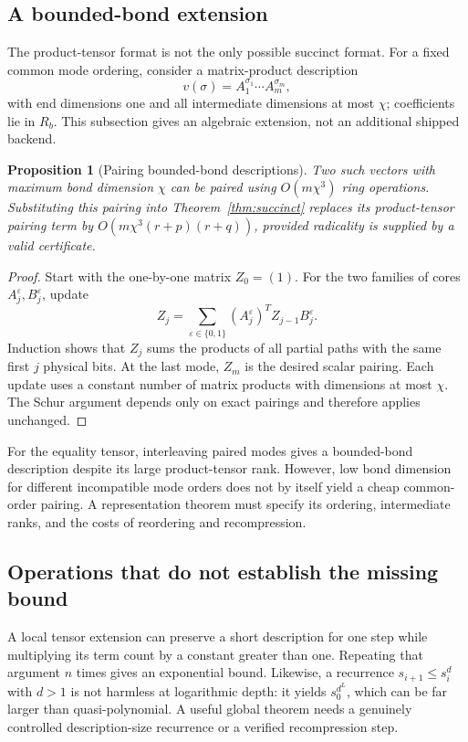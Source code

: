 \documentclass[11pt]{article}
\newtheorem{proposition}[theorem]{Proposition}
\theoremstyle{definition}\newtheorem{definition}[theorem]{Definition}
\theoremstyle{remark}\newtheorem{remark}[theorem]{Remark}
\newcommand{\eps}{\varepsilon}
\begin{document}
\subsection{A bounded-bond extension}
The product-tensor format is not the only possible succinct format. For a fixed common mode ordering, consider a matrix-product description
\[
 v(\sigma)=A_1^{\sigma_1}\cdots A_m^{\sigma_m},
\]
with end dimensions one and all intermediate dimensions at most $\chi$; coefficients lie in $R_b$. This subsection gives an algebraic extension, not an additional shipped backend.

\begin{proposition}[Pairing bounded-bond descriptions]\label{prop:bond}
Two such vectors with maximum bond dimension $\chi$ can be paired using $O(m\chi^3)$ ring operations. Substituting this pairing into Theorem~\ref{thm:succinct} replaces its product-tensor pairing term by $O(m\chi^3(r+p)(r+q))$, provided radicality is supplied by a valid certificate.
\end{proposition}
\begin{proof}
Start with the one-by-one matrix $Z_0=(1)$. For the two families of cores $A_j^\eps,B_j^\eps$, update
\[
 Z_j=\sum_{\eps\in\{0,1\}}(A_j^\eps)^T Z_{j-1} B_j^\eps.
\]
Induction shows that $Z_j$ sums the products of all partial paths with the same first $j$ physical bits. At the last mode, $Z_m$ is the desired scalar pairing. Each update uses a constant number of matrix products with dimensions at most $\chi$. The Schur argument depends only on exact pairings and therefore applies unchanged.
\end{proof}

For the equality tensor, interleaving paired modes gives a bounded-bond description despite its large product-tensor rank. However, low bond dimension for different incompatible mode orders does not by itself yield a cheap common-order pairing. A representation theorem must specify its ordering, intermediate ranks, and the costs of reordering and recompression.

\subsection{Operations that do not establish the missing bound}
A local tensor extension can preserve a short description for one step while multiplying its term count by a constant greater than one. Repeating that argument $n$ times gives an exponential bound. Likewise, a recurrence $s_{i+1}\leq s_i^d$ with $d>1$ is not harmless at logarithmic depth: it yields $s_0^{d^L}$, which can be far larger than quasi-polynomial. A useful global theorem needs a genuinely controlled description-size recurrence or a verified recompression step.
\end{document}
